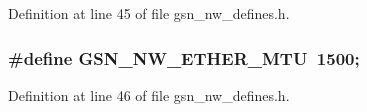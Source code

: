 Definition at line 45 of file gsn\_\-nw\_\-defines.h.

\hypertarget{a00533_a8909f0df52e224e9ffd677ca79cf88e5}{
\subsubsection[{GSN\_\-NW\_\-ETHER\_\-MTU}]{\setlength{\rightskip}{0pt plus 5cm}\#define GSN\_\-NW\_\-ETHER\_\-MTU~1500;}}
\label{a00533_a8909f0df52e224e9ffd677ca79cf88e5}


Definition at line 46 of file gsn\_\-nw\_\-defines.h.

